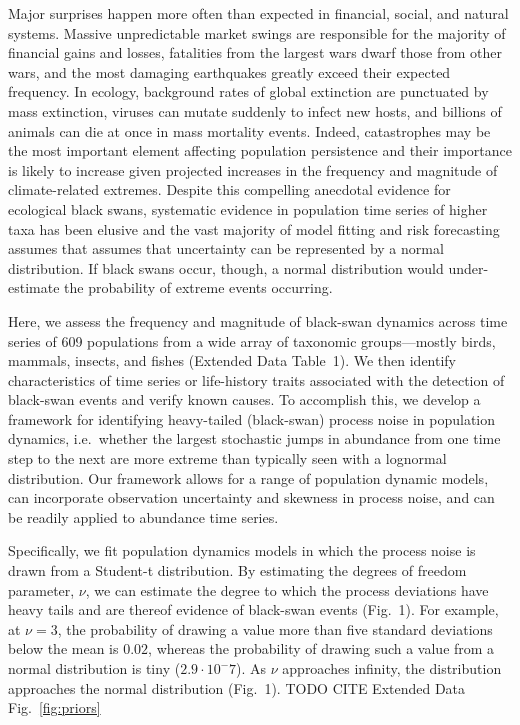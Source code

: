 \clearpage

Major surprises happen more often than expected in financial, social, and natural systems\cite{taleb2007, may2008}. Massive unpredictable market swings are responsible for the majority of financial gains and losses\cite{taleb2007}, fatalities from the largest wars dwarf those from other wars\cite{newman2005}, and the most damaging earthquakes greatly exceed their expected frequency\cite{sornette2009}. In ecology, background rates of global extinction are punctuated by mass extinction\cite{harnik2012}, viruses can mutate suddenly to infect new hosts, and billions of animals can die at once in mass mortality events\cite{fey2015}. Indeed, catastrophes may be the most important element affecting population persistence\cite{mangel1994} and their importance is likely to increase given projected increases in the frequency and magnitude of climate-related extremes\cite{ipcc2012}. Despite this compelling anecdotal evidence for ecological black swans, systematic evidence in population time series of higher taxa has been elusive\cite{keitt1998, allen2001, halley2002} and the vast majority of model fitting and risk forecasting assumes that assumes that uncertainty can be represented by a normal distribution\cite{brook2006a, dennis2006, knape2012}. If black swans occur, though, a normal distribution would under-estimate the probability of extreme events occurring.

Here, we assess the frequency and magnitude of black-swan dynamics across time series of 609 populations from a wide array of taxonomic groups---mostly birds, mammals, insects, and fishes (Extended Data Table~1). We then identify characteristics of time series or life-history traits associated with the detection of black-swan events and verify known causes. To accomplish this, we develop a framework for identifying heavy-tailed (black-swan) process noise in population dynamics, i.e.~whether the largest stochastic jumps in abundance from one time step to the next are more extreme than typically seen with a lognormal distribution. Our framework allows for a range of population dynamic models, can incorporate observation uncertainty and skewness in process noise, and can be readily applied to abundance time series.

Specifically, we fit population dynamics models in which the process noise is drawn from a Student-t distribution. By estimating the degrees of freedom parameter, \(\nu\), we can estimate the degree to which the process deviations have heavy tails and are thereof evidence of black-swan events (Fig.~1). For example, at \(\nu = 3\), the probability of drawing a value more than five standard deviations below the mean is \(0.02\), whereas the probability of drawing such a value from a normal distribution is tiny (\(2.9\cdot10^-7\)). As \(\nu\) approaches infinity, the distribution approaches the normal distribution (Fig.~1). TODO CITE Extended Data Fig.~\ref{fig:priors}

